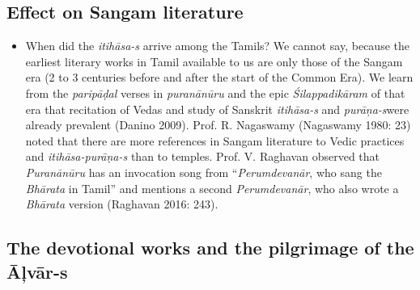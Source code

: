 \subsection*{Effect on Sangam literature}

\begin{itemize}
\item When did the \textit{itihāsa-s} arrive among the Tamils? We cannot say, because the earliest literary works in Tamil available to us are only those of the Sangam era (2 to 3 centuries before and after the start of the Common Era). We learn from the \textit{paripāḍal} verses in \textit{puranānūru} and the epic \textit{Śilappadikāram} of that era that recitation of Vedas and study of Sanskrit \textit{itihāsa-s} and \textit{purāņa-s}\break were already prevalent (Danino 2009). Prof. R. Nagaswamy (Nagaswamy 1980: 23) noted that there are more references in Sangam literature to Vedic practices and \textit{itihāsa-purāṇa-s} than to temples. Prof. V. Raghavan observed that \textit{Puranānūru} has an invocation song from “\textit{Perumdevanār}, who sang the \textit{Bhārata} in Tamil” and mentions a second \textit{Perumdevanār}, who also wrote a \textit{Bhārata} version (Raghavan 2016: 243).

\end{itemize}


\subsection*{The devotional works and the pilgrimage of the Āļvār-s}

